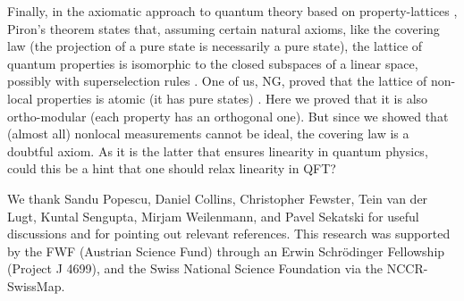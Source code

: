 \documentclass[a4paper,twocolumn,11pt,accepted=2024-02-14]{quantumarticle}
\begin{document}
Finally, in the axiomatic approach to quantum theory based on property-lattices \cite{jauch1969structure}, Piron’s theorem states that, assuming certain natural axioms, like the covering law (the projection of a pure state is necessarily a pure state), the lattice of quantum properties is isomorphic to the closed subspaces of a linear space, possibly with superselection rules \cite{piron1964axiomatique}. One of us, NG, proved that the lattice of non-local properties is atomic (it has pure states) \cite{gisin1986property}. Here we proved that it is also ortho-modular (each property has an orthogonal one). But since we showed that (almost all) nonlocal measurements cannot be ideal, the covering law is a doubtful axiom. As it is the latter that ensures linearity in quantum physics, could this be a hint that one should relax linearity in QFT?



\acknowledgements
We thank Sandu Popescu, Daniel Collins, 
Christopher Fewster, Tein van der Lugt, Kuntal Sengupta, Mirjam Weilenmann, and Pavel Sekatski for useful discussions and for pointing out relevant references. 
This research was supported by the FWF (Austrian Science Fund) through an Erwin Schr\"odinger Fellowship (Project J 4699), and the Swiss National Science Foundation via the NCCR-SwissMap.



\end{document}
